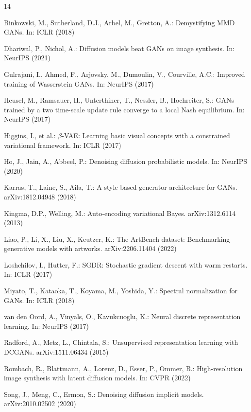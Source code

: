 \documentclass[runningheads]{llncs}
\begin{document}
\begin{thebibliography}{14}

Binkowski, M., Sutherland, D.J., Arbel, M., Gretton, A.: Demystifying MMD GANs. In: ICLR (2018)

Dhariwal, P., Nichol, A.: Diffusion models beat GANs on image synthesis. In: NeurIPS (2021)

Gulrajani, I., Ahmed, F., Arjovsky, M., Dumoulin, V., Courville, A.C.: Improved training of Wasserstein GANs. In: NeurIPS (2017)

Heusel, M., Ramsauer, H., Unterthiner, T., Nessler, B., Hochreiter, S.: GANs trained by a two time-scale update rule converge to a local Nash equilibrium. In: NeurIPS (2017)

Higgins, I., et al.: $\beta$-VAE: Learning basic visual concepts with a constrained variational framework. In: ICLR (2017)

Ho, J., Jain, A., Abbeel, P.: Denoising diffusion probabilistic models. In: NeurIPS (2020)

Karras, T., Laine, S., Aila, T.: A style-based generator architecture for GANs. arXiv:1812.04948 (2018)

Kingma, D.P., Welling, M.: Auto-encoding variational Bayes. arXiv:1312.6114 (2013)

Liao, P., Li, X., Liu, X., Keutzer, K.: The ArtBench dataset: Benchmarking generative models with artworks. arXiv:2206.11404 (2022)

Loshchilov, I., Hutter, F.: SGDR: Stochastic gradient descent with warm restarts. In: ICLR (2017)

Miyato, T., Kataoka, T., Koyama, M., Yoshida, Y.: Spectral normalization for GANs. In: ICLR (2018)

van den Oord, A., Vinyals, O., Kavukcuoglu, K.: Neural discrete representation learning. In: NeurIPS (2017)

Radford, A., Metz, L., Chintala, S.: Unsupervised representation learning with DCGANs. arXiv:1511.06434 (2015)

Rombach, R., Blattmann, A., Lorenz, D., Esser, P., Ommer, B.: High-resolution image synthesis with latent diffusion models. In: CVPR (2022)

Song, J., Meng, C., Ermon, S.: Denoising diffusion implicit models. arXiv:2010.02502 (2020)

\end{thebibliography}
\end{document}
